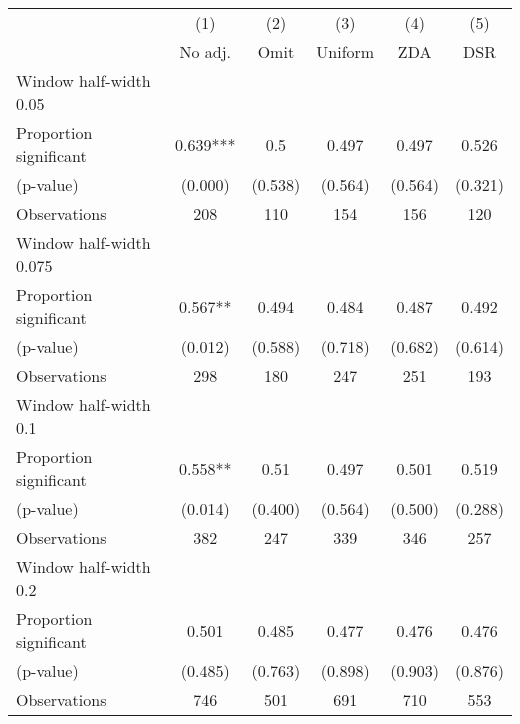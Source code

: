 
\def\sym#1{\ifmmode^{#1}\else\(^{#1}\)\fi}
\begin{tabular}{l*{5}{c}}
\hline\hline
& \multicolumn{1}{c}{(1)} &  \multicolumn{1}{c}{(2)} &  \multicolumn{1}{c}{(3)} &  \multicolumn{1}{c}{(4)} &  \multicolumn{1}{c}{(5)}\\
& \multicolumn{1}{c}{No adj.} &  \multicolumn{1}{c}{Omit} &  \multicolumn{1}{c}{Uniform} &  \multicolumn{1}{c}{ZDA} &  \multicolumn{1}{c}{DSR}\\

\hline
\hline
Window half-width 0.05\\

Proportion significant& 0.639*** &  0.5 &  0.497 &  0.497 &  0.526\\

(p-value) & (0.000) &  (0.538) &  (0.564) &  (0.564) &  (0.321)\\

Observations& 208 &  110 &  154 &  156 &  120\\

\hline
Window half-width 0.075\\

Proportion significant& 0.567** &  0.494 &  0.484 &  0.487 &  0.492\\

(p-value) & (0.012) &  (0.588) &  (0.718) &  (0.682) &  (0.614)\\

Observations& 298 &  180 &  247 &  251 &  193\\

\hline
Window half-width 0.1\\

Proportion significant& 0.558** &  0.51 &  0.497 &  0.501 &  0.519\\

(p-value) & (0.014) &  (0.400) &  (0.564) &  (0.500) &  (0.288)\\

Observations& 382 &  247 &  339 &  346 &  257\\

\hline
Window half-width 0.2\\

Proportion significant& 0.501 &  0.485 &  0.477 &  0.476 &  0.476\\

(p-value) & (0.485) &  (0.763) &  (0.898) &  (0.903) &  (0.876)\\

Observations& 746 &  501 &  691 &  710 &  553\\


\end{tabular}
